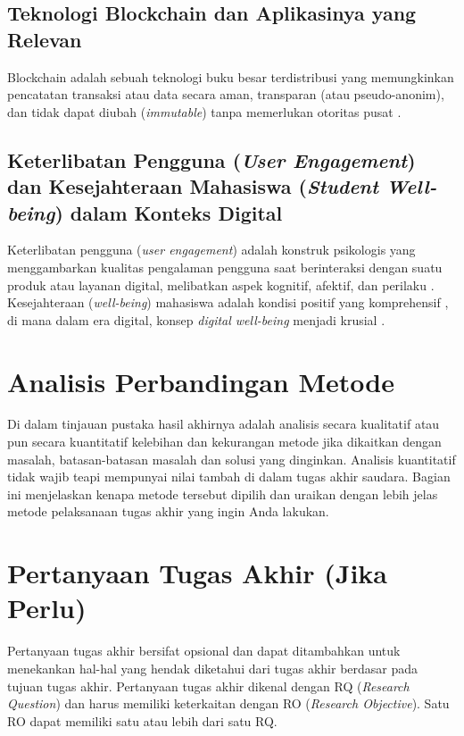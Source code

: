 \subsection{Teknologi Blockchain dan Aplikasinya yang Relevan}
\label{subsec:teori_blockchain_detail_revised}
Blockchain adalah sebuah teknologi buku besar terdistribusi yang memungkinkan pencatatan transaksi atau data secara aman, transparan (atau pseudo-anonim), dan tidak dapat diubah (\textit{immutable}) tanpa memerlukan otoritas pusat \cite{blockchain_security_privacy_education_2020, blockchain_education_transforming_2024}.

\subsection{Keterlibatan Pengguna (\textit{User Engagement}) dan Kesejahteraan Mahasiswa (\textit{Student Well-being}) dalam Konteks Digital}
\label{subsec:teori_engagement_wellbeing_detail_revised}
Keterlibatan pengguna (\textit{user engagement}) adalah konstruk psikologis yang menggambarkan kualitas pengalaman pengguna saat berinteraksi dengan suatu produk atau layanan digital, melibatkan aspek kognitif, afektif, dan perilaku \cite{ng_user_engagement_systematic_review_2022}. Kesejahteraan (\textit{well-being}) mahasiswa adalah kondisi positif yang komprehensif \cite{ai_effects_student_wellbeing_2025}, di mana dalam era digital, konsep \textit{digital well-being} menjadi krusial \cite{borges_digital_wellbeing_higher_ed_2021}.


\section{Analisis Perbandingan Metode}
\label{sec:analisis_metode_revised}

Di dalam tinjauan pustaka hasil akhirnya adalah analisis secara kualitatif atau pun secara kuantitatif kelebihan dan kekurangan metode jika dikaitkan dengan masalah, batasan-batasan masalah dan solusi yang dinginkan. Analisis kuantitatif tidak wajib teapi mempunyai nilai tambah di dalam tugas akhir saudara. Bagian ini menjelaskan kenapa metode tersebut dipilih dan uraikan dengan lebih jelas metode pelaksanaan tugas akhir yang ingin Anda lakukan. 

\section{Pertanyaan Tugas Akhir (Jika Perlu)}
\label{sec:pertanyaan_ta_revised}

Pertanyaan tugas akhir bersifat opsional dan dapat ditambahkan untuk menekankan hal-hal yang hendak diketahui dari tugas akhir berdasar pada tujuan tugas akhir. Pertanyaan tugas akhir dikenal dengan RQ (\textit{Research Question}) dan harus memiliki keterkaitan dengan RO (\textit{Research Objective}). Satu RO dapat memiliki satu atau lebih dari satu RQ.
